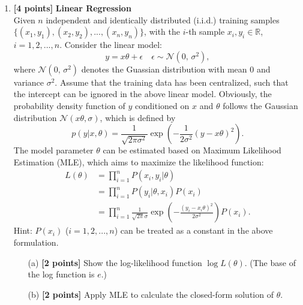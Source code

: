 \documentclass[10pt]{article}
\begin{document}
\begin{enumerate}
	\item \textbf{[4 points]} \textbf{Linear Regression} \\
	      Given $n$ independent and identically distributed (i.i.d.) training samples
	      $\{(x_1, y_1), (x_2, y_2), ... , (x_n, y_n)\}$, with the $i$-th sample $x_i, y_i \in \mathbb{R}$, $i=1,2,...,n$.
	      Consider the linear model:
	      \begin{equation}
		      y = x\theta + \epsilon \quad \epsilon\sim\mathcal{N}(0,\,\sigma^{2}),
	      \end{equation}
	      where $\mathcal{N}(0,\,\sigma^{2})$ denotes the Guassian distribution with mean 0 and variance $\sigma^2$.
	      Assume that the training data has been centralized, such that the intercept can be ignored in the above linear model.
	      Obviously, the probability density function of $y$ conditioned on $x$ and $\theta$ follows the Gaussian distribution $\mathcal{N}(x\theta,\sigma)$,
	      which is defined by
	      \begin{equation}
		      p(y|x,\theta) = \frac{1}{\sqrt{2\pi\sigma^2}}\exp(-\frac{1}{2\sigma^2}(y-x\theta)^2).
	      \end{equation}
	      The model parameter $\theta$ can be estimated based on Maximum Likelihood Estimation (MLE), which aims to maximize the likelihood function:
	      \begin{align}
		      L(\theta) & = \prod_{i=1}^n P(x_i,y_i|\theta) \nonumber                                                   \\
		                & = \prod_{i=1}^n P(y_i|\theta, x_i)P(x_i) \nonumber                                            \\
		                & = \prod_{i=1}^n \frac{1}{\sqrt{2\pi}\sigma}\exp(-\frac{(y_i - x_i\theta)^2}{2\sigma^2})P(x_i).
	      \end{align}
		  Hint: $P(x_i)$ ($i=1,2,...,n$) can be treated as a constant in the above formulation.
	      \begin{itemize}
		      \item[(a)] \textbf{[2 points]} Show the log-likelihood function $\log L(\theta)$. (The base of the log function is $e$.)
		      \item[(b)] \textbf{[2 points]} Apply MLE to calculate the closed-form solution of $\theta$.
	      \end{itemize}


\end{enumerate}
\end{document}
